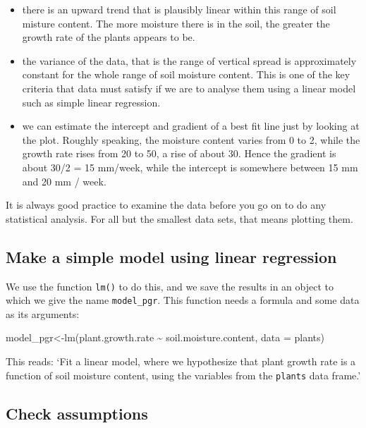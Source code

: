 \documentclass[
  letterpaper,
  DIV=11,
  numbers=noendperiod]{scrreprt}
\newenvironment{Shaded}{\begin{snugshade}}{\end{snugshade}}
\newcommand{\AttributeTok}[1]{\textcolor[rgb]{0.40,0.45,0.13}{#1}}
\newcommand{\FunctionTok}[1]{\textcolor[rgb]{0.28,0.35,0.67}{#1}}
\newcommand{\NormalTok}[1]{\textcolor[rgb]{0.00,0.23,0.31}{#1}}
\newcommand{\OtherTok}[1]{\textcolor[rgb]{0.00,0.23,0.31}{#1}}
\newcommand{\SpecialCharTok}[1]{\textcolor[rgb]{0.37,0.37,0.37}{#1}}
\providecommand{\tightlist}{%
  \setlength{\itemsep}{0pt}\setlength{\parskip}{0pt}}\usepackage{longtable,booktabs,array}
\begin{document}
\begin{itemize}
\tightlist
\item
  there is an upward trend that is plausibly linear within this range of
  soil misture content. The more moisture there is in the soil, the
  greater the growth rate of the plants appears to be.
\item
  the variance of the data, that is the range of vertical spread is
  approximately constant for the whole range of soil moisture content.
  This is one of the key criteria that data must satisfy if we are to
  analyse them using a linear model such as simple linear regression.
\item
  we can estimate the intercept and gradient of a best fit line just by
  looking at the plot. Roughly speaking, the moisture content varies
  from 0 to 2, while the growth rate rises from 20 to 50, a rise of
  about 30. Hence the gradient is about 30/2 = 15 mm/week, while the
  intercept is somewhere between 15 mm and 20 mm / week.
\end{itemize}

It is always good practice to examine the data before you go on to do
any statistical analysis. For all but the smallest data sets, that means
plotting them.

\subsection{Make a simple model using linear
regression}\label{make-a-simple-model-using-linear-regression}

We use the function \texttt{lm()} to do this, and we save the results in
an object to which we give the name \texttt{model\_pgr}. This function
needs a formula and some data as its arguments:

\begin{Shaded}
\begin{Highlighting}[]
\NormalTok{model\_pgr}\OtherTok{\textless{}{-}}\FunctionTok{lm}\NormalTok{(plant.growth.rate }\SpecialCharTok{\textasciitilde{}}\NormalTok{ soil.moisture.content, }\AttributeTok{data =}\NormalTok{ plants)}
\end{Highlighting}
\end{Shaded}

This reads: `Fit a linear model, where we hypothesize that plant growth
rate is a function of soil moisture content, using the variables from
the \texttt{plants} data frame.'

\subsection{Check assumptions}\label{check-assumptions}
\end{document}
